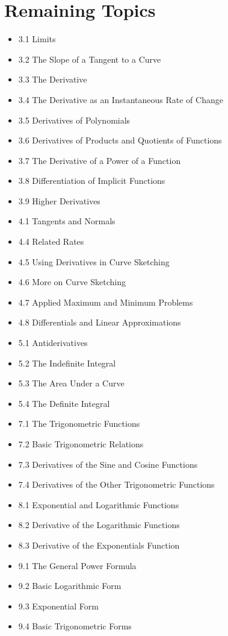 \documentclass[11pt]{article}
\begin{document}
\section*{Remaining Topics}

\begin{itemize}
  \item 3.1 Limits
  \item 3.2 The Slope of a Tangent to a Curve
  \item 3.3 The Derivative
  \item 3.4 The Derivative as an Instantaneous Rate of Change
  \item 3.5 Derivatives of Polynomials
  \item 3.6 Derivatives of Products and Quotients of Functions
  \item 3.7 The Derivative of a Power of a Function
  \item 3.8 Differentiation of Implicit Functions
  \item 3.9 Higher Derivatives
  \item 4.1 Tangents and Normals
  \item 4.4 Related Rates
  \item 4.5 Using Derivatives in Curve Sketching
  \item 4.6 More on Curve Sketching
  \item 4.7 Applied Maximum and Minimum Problems
  \item 4.8 Differentials and Linear Approximations
  \item 5.1 Antiderivatives
  \item 5.2 The Indefinite Integral
  \item 5.3 The Area Under a Curve
  \item 5.4 The Definite Integral
  \item 7.1 The Trigonometric Functions
  \item 7.2 Basic Trigonometric Relations
  \item 7.3 Derivatives of the Sine and Cosine Functions
  \item 7.4 Derivatives of the Other Trigonometric Functions
  \item 8.1 Exponential and Logarithmic Functions
  \item 8.2 Derivative of the Logarithmic Functions
  \item 8.3 Derivative of the Exponentials Function
  \item 9.1 The General Power Formula
  \item 9.2 Basic Logarithmic Form
  \item 9.3 Exponential Form
  \item 9.4 Basic Trigonometric Forms
\end{itemize}
\end{document}
